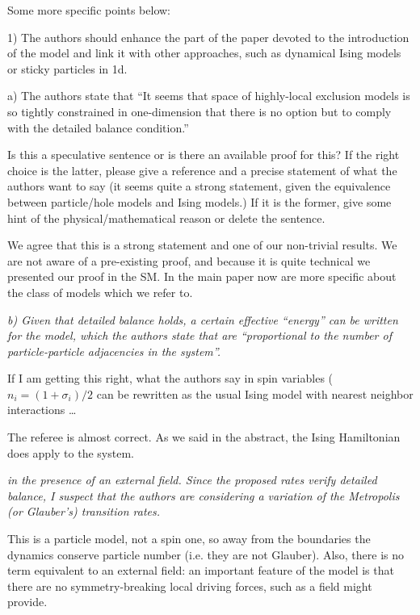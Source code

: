 \documentclass[a4paper,10pt]{article}
\begin{document}
{\it

   Some more specific points below:
  
   1) The authors should enhance the part of the paper devoted to the
   introduction of the model and link it with other approaches, such as
   dynamical Ising models or sticky particles in 1d.
  
   a) The authors state that ``It seems that space of highly-local
   exclusion models is so tightly constrained in one-dimension that there
   is no option but to comply with the detailed balance condition.''
  
   Is this a speculative sentence or is there an available proof for
   this? If the right choice is the latter, please give a reference and a
   precise statement of what the authors want to say (it seems quite a
   strong statement, given the equivalence between particle/hole models
   and Ising models.) If it is the former, give some hint of the
   physical/mathematical reason or delete the sentence. }
  

We agree that this is a strong statement and one of our non-trivial
results.  We are not aware of a pre-existing proof, and because it is quite technical we
presented our proof in the SM.  In the main paper now are more specific about the class
of models which we refer to.


  {\it
   b) Given that detailed balance holds, a certain effective ``energy'' can
   be written for the model, which the authors state that are
   ``proportional to the number of particle-particle adjacencies in the
   system''.
  
   If I am getting this right, what the authors say in spin variables
   ($n_i=(1+\sigma_i)/2$ can be rewritten as the usual Ising model with
   nearest neighbor interactions \dots}

The referee is almost correct. As we said in the abstract, the Ising
Hamiltonian does apply to the system.  

{\it  in the presence of an external field. Since the proposed rates verify detailed balance, I suspect that the
   authors are considering a variation of the Metropolis (or Glauber's)
   transition rates.}

This is a particle model, not a spin one, so away from the boundaries
the dynamics conserve particle number (i.e. they are not Glauber).
Also, there is no term equivalent to an external field: an important
feature of the model is that there are no symmetry-breaking local driving forces, such as a field might provide.
\end{document}

